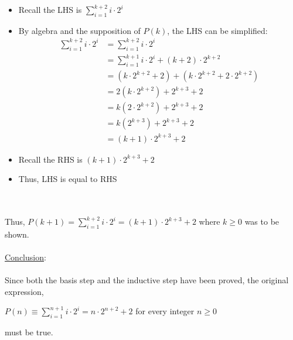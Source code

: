 \documentclass[12pt]{article}
\newcommand{\xlist}[1]{
    \begin{itemize}
        \renewcommand{\labelitemi}{$\centerdot$}
        #1
    \end{itemize}
    \newblock
    \\ \\
}
\newcommand{\xconclusion}[1]{
    \underline{Conclusion}:
    \\ \\
    #1
    \\ \\
}
\begin{document}
\xlist{
  \item Recall the LHS is $\sum_{i=1}^{k+2}i \cdot 2^i$
  \item By algebra and the supposition of $P(k)$, the LHS can be simplified:
  \begin{align*}
    \sum_{i=1}^{k+2}i \cdot 2^i &= \sum_{i=1}^{k+2}i \cdot 2^i \\ 
    &= \sum_{i=1}^{k+1}i \cdot 2^i + (k+2)\cdot 2^{k+2} \\
    &= (k \cdot 2^{k+2} + 2) + (k\cdot 2^{k+2} + 2\cdot 2^{k+2}) \\
    &= 2(k\cdot 2^{k+2}) + 2^{k+3} + 2 \\
    &= k(2\cdot 2^{k+2}) + 2^{k+3} + 2 \\
    &= k(2^{k+3}) + 2^{k+3} + 2 \\
    &= (k+1) \cdot 2^{k+3} + 2
    \end{align*}
  \item Recall the RHS is $(k+1) \cdot 2^{k+3} + 2$
  \item Thus, LHS is equal to RHS
}
Thus, $P(k+1) = \sum_{i=1}^{k+2}i \cdot 2^i = (k+1) \cdot 2^{k+3} + 2$ where $k \geq 0$ was to be shown.
\\ \\
\xconclusion{
Since both the basis step and the inductive step have been proved, the original expression,
\begin{center}
  $P(n) \equiv \sum_{i=1}^{n+1}i \cdot 2^i = n \cdot 2^{n+2} + 2$ for every integer $n \geq 0$
\end{center}
must be true.
}
\end{document}
